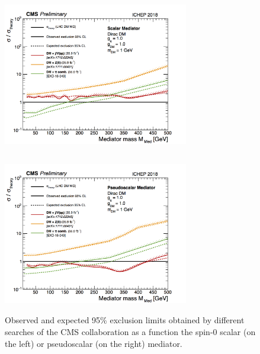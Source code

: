 \documentclass[a4paper, 10pt, openright]{report}
\begin{document}
\begin{figure}[htbp]
\centering
\begin{minipage}[b]{.49\textwidth}
\includegraphics[width=8.1cm, height=7cm]{figs/SummaryScalar.png}
\end{minipage}\hfill
\begin{minipage}[b]{.49\textwidth}
\includegraphics[width=8.1cm, height=7cm]{figs/SummaryPseudoScalar.png}
\end{minipage} \hfill
\caption{Observed and expected 95\% exclusion limits obtained by different searches of the \ac{CMS} collaboration as a function the spin-0 scalar (on the left) or pseudoscalar (on the right) mediator.}
\label{fig:SummarySpin0}
\end{figure}
\end{document}
